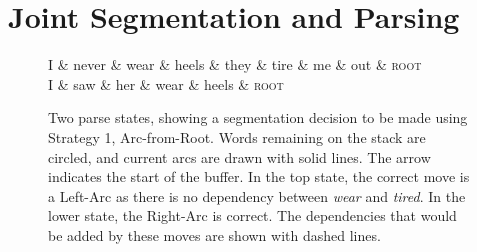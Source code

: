 \documentclass[11pt,letterpaper]{article}
\begin{document}
\clearpage

\section{Joint Segmentation and Parsing}

%

\begin{figure}
\begin{dependency}[theme=simple, edge unit distance=1.0ex]
    \begin{deptext}[row sep=2.0ex]
        I \& never \& wear \& heels \& they \& tire \& me \& out \& \textsc{root} \\
        I \& saw \& her \& wear \& heels \& \textsc{root} \\
    \end{deptext}




    \end{dependency}
    \vspace*{-2em}
\caption{\small Two parse states, showing a segmentation decision to be made using
    Strategy 1, Arc-from-Root.
    Words remaining on the stack are
    circled, and current arcs are drawn with solid lines.  The arrow indicates
    the start of the buffer.  In the top state, the correct move is a Left-Arc
    as there is no dependency between \emph{wear} and \emph{tired}.  In the
    lower state, the Right-Arc is correct.  The  dependencies that would be
added by these moves are shown with dashed lines.\label{fig:left_state}}
\vspace*{-3em}
\end{figure}
\end{document}
